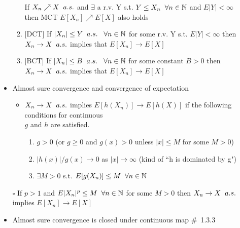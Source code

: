 \documentclass[12pt, A4]{article}
\begin{document}
\begin{itemize}
\begin{enumerate}
		\newline If $X_n\nearrow X \hspace{0.2cm} a.s.$ and $\exists$ a r.v. Y s.t. $Y\leq X_n \hspace{0.2cm} \forall n \in \mathbb{N}$ and $E|Y|<\infty$ \\then MCT $E[X_n]\nearrow E[X]$ also holds
		\item {[DCT]} If $|X_n|\leq Y \hspace{0.2cm} a.s.\hspace{0.3cm} \forall n\in \mathbb{N}$ for some r.v. Y s.t. $E|Y|<\infty$ then $X_n\rightarrow X\hspace{0.2cm} a.s.$ implies that $E[X_n]\rightarrow E[X]$
		\item {[BCT]} If $|X_n|\leq B \hspace{0.2cm} a.s.\hspace{0.3cm} \forall n\in \mathbb{N}$ for some constant $B>0$ then $X_n\rightarrow X\hspace{0.2cm} a.s.$ implies that $E[X_n]\rightarrow E[X]$
	\end{enumerate}
    \item Almost sure convergence and convergence of expectation
    \begin{itemize}
    	\item $X_n\rightarrow X \hspace{0.2cm} a.s.$ implies $E[h(X_n)]\rightarrow E[h(X)]$ if the following conditions for continuous \\ $g$ and $h$ are satisfied.
    	\begin{enumerate}
    		\item $g>0$ (or $g\geq 0$ and $g(x)>0$ unless $|x|\leq M$ for some $M>0$)
    		\item $|h(x)|/g(x)\rightarrow 0$ as $|x|\rightarrow \infty$ (kind of ``h is dominated by g")
    		\item $\exists M>0$ s.t. $E[g(X_n)]\leq M \hspace{0.2cm} \forall n\in \mathbb{N}$
    	\end{enumerate}
    \end{itemize}
    \item [$\square$] If $p>1$ and $E|X_n|^p\leq M \hspace{0.2cm} \forall n\in \mathbb{N}$ for some $M>0$ \newline then $X_n\rightarrow X \hspace{0.2cm} a.s.$ implies $E[X_n]\rightarrow E[X]$
    \item Almost sure convergence is closed under continuous map \quad \#\ 1.3.3

\end{itemize}
\end{document}
